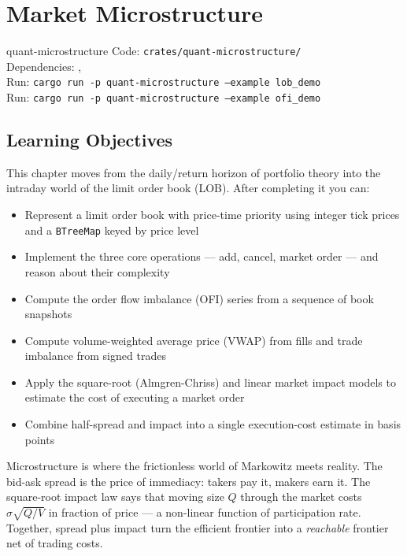 \chapter{Market Microstructure}
\label{ch:microstructure}

\begin{companioncode}{quant-microstructure}
Code: \texttt{crates/quant-microstructure/}\\
Dependencies: , \\
Run: \texttt{cargo run -p quant-microstructure --example lob\_demo}\\
Run: \texttt{cargo run -p quant-microstructure --example ofi\_demo}
\end{companioncode}

\section{Learning Objectives}

This chapter moves from the daily/return horizon of portfolio theory
into the intraday world of the limit order book (LOB). After completing
it you can:

\begin{itemize}
    \item Represent a limit order book with price-time priority using
      integer tick prices and a \texttt{BTreeMap} keyed by price level
    \item Implement the three core operations --- add, cancel, market
      order --- and reason about their complexity
    \item Compute the order flow imbalance (OFI) series from a sequence
      of book snapshots
    \item Compute volume-weighted average price (VWAP) from fills and
      trade imbalance from signed trades
    \item Apply the square-root (Almgren-Chriss) and linear market
      impact models to estimate the cost of executing a market order
    \item Combine half-spread and impact into a single execution-cost
      estimate in basis points
\end{itemize}

\begin{keyinsight}
Microstructure is where the frictionless world of Markowitz meets
reality. The bid-ask spread is the price of immediacy: takers pay it,
makers earn it. The square-root impact law says that moving size
$Q$ through the market costs $\sigma\sqrt{Q/V}$ in fraction of price
--- a non-linear function of participation rate. Together, spread
plus impact turn the efficient frontier into a \emph{reachable}
frontier net of trading costs.
\end{keyinsight}

